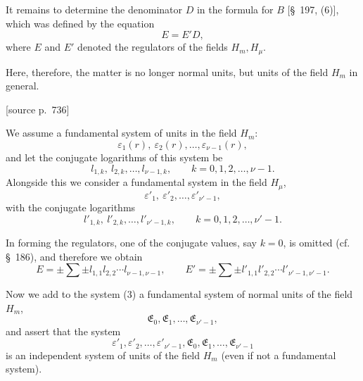 \documentclass[11pt]{article}
\newcommand{\srcpage}[1]{\par\medskip\noindent\textsf{[source p.~#1]}\par\smallskip}
\begin{document}
It remains to determine the denominator $D$ in the formula for $B$ [\S~197, (6)], which was defined by the equation
\[
E=E'D,
\]
where $E$ and $E'$ denoted the regulators of the fields $H_m,H_\mu$.

Here, therefore, the matter is no longer normal units, but units of the field $H_m$ in general.

\srcpage{736}
We assume a fundamental system of units in the field $H_m$:
\begin{equation}
\varepsilon_1(r),\ \varepsilon_2(r),\ldots,\varepsilon_{\nu-1}(r),
\tag{1}
\end{equation}
and let the conjugate logarithms of this system be
\begin{equation}
l_{1,k},\ l_{2,k},\ldots,l_{\nu-1,k},\qquad k=0,1,2,\ldots,\nu-1.
\tag{2}
\end{equation}
Alongside this we consider a fundamental system in the field $H_\mu$,
\begin{equation}
\varepsilon'_1,\ \varepsilon'_2,\ldots,\varepsilon'_{\nu'-1},
\tag{3}
\end{equation}
with the conjugate logarithms
\begin{equation}
l'_{1,k},\ l'_{2,k},\ldots,l'_{\nu'-1,k},\qquad k=0,1,2,\ldots,\nu'-1.
\tag{4}
\end{equation}

In forming the regulators, one of the conjugate values, say $k=0$, is omitted (cf. \S~186), and therefore we obtain
\begin{equation}
E=\pm\sum\pm l_{1,1}l_{2,2}\cdots l_{\nu-1,\nu-1},
\qquad
E'=\pm\sum\pm l'_{1,1}l'_{2,2}\cdots l'_{\nu'-1,\nu'-1}.
\tag{5}
\end{equation}

Now we add to the system (3) a fundamental system of normal units of the field $H_m$,
\begin{equation}
\mathfrak E_0,\mathfrak E_1,\ldots,\mathfrak E_{\nu'-1},
\tag{6}
\end{equation}
and assert that the system
\begin{equation}
\varepsilon'_1,\varepsilon'_2,
\ldots,\varepsilon'_{\nu'-1},\mathfrak E_0,\mathfrak E_1,
\ldots,\mathfrak E_{\nu'-1}
\tag{7}
\end{equation}
is an independent system of units of the field $H_m$ (even if not a fundamental system).
\end{document}
